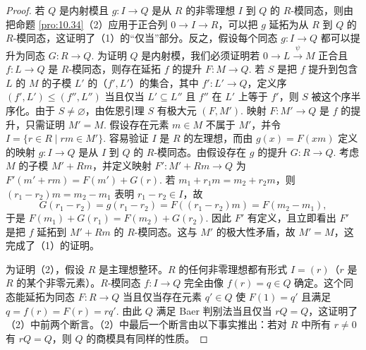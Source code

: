 \begin{proof}
若 \(Q\) 是内射模且 \(g : I \to Q\) 是从 \(R\) 的非零理想 \(I\) 到 \(Q\) 的 \(R\)-模同态，则由把命题 \ref{pro:10.34}（2）应用于正合列 \(0 \to I \to R\)，可以把 \(g\) 延拓为从 \(R\) 到 \(Q\) 的 \(R\)-模同态，这证明了（1）的“仅当”部分。反之，假设每个同态 \(g : I \to Q\) 都可以提升为同态 \(G : R \to Q\). 为证明 \(Q\) 是内射模，我们必须证明若 \(0 \to L \xrightarrow{\psi} M\) 正合且 \(f : L \to Q\) 是 \(R\)-模同态，则存在延拓 \(f\) 的提升 \(F : M \to Q\). 若 \(S\) 是把 \(f\) 提升到包含 \(L\) 的 \(M\) 的子模 \(L'\) 的（\(f', L'\)）的集合，其中 \(f' : L' \to Q\)，定义序 \((f', L') \leq (f'', L'')\) 当且仅当 \(L' \subseteq L''\) 且 \(f''\) 在 \(L'\) 上等于 \(f'\)，则 \(S\) 被这个序半序化。由于 \(S \neq \varnothing\)，由佐恩引理 \(S\) 有极大元 \((F, M')\). 映射 \(F : M' \to Q\) 是 \(f\) 的提升，只需证明 \(M' = M\). 假设存在元素 \(m \in M\) 不属于 \(M'\)，并令 \(I = \{r \in R \mid rm \in M'\}\). 容易验证 \(I\) 是 \(R\) 的左理想，而由 \(g(x) = F(xm)\) 定义的映射 \(g : I \to Q\) 是从 \(I\) 到 \(Q\) 的 \(R\)-模同态。由假设存在 \(g\) 的提升 \(G : R \to Q\). 考虑 \(M\) 的子模 \(M'+Rm\)，并定义映射 \(F' : M'+Rm \to Q\) 为 \(F'(m'+rm) = F(m')+G(r)\). 若 \(m_1+r_1m = m_2+r_2m\)，则 \((r_1-r_2)m = m_2-m_1\) 表明 \(r_1-r_2 \in I\)，故
\[
G(r_1-r_2) = g(r_1-r_2) = F((r_1-r_2)m) = F(m_2-m_1),
\]
于是 \(F(m_1)+G(r_1) = F(m_2)+G(r_2)\). 因此 \(F'\) 有定义，且立即看出 \(F'\) 是把 \(f\) 延拓到 \(M'+Rm\) 的 \(R\)-模同态。这与 \(M'\) 的极大性矛盾，故 \(M' = M\)，这完成了（1）的证明。

为证明（2），假设 \(R\) 是主理想整环。\(R\) 的任何非零理想都有形式 \(I = (r)\)（\(r\) 是 \(R\) 的某个非零元素）。\(R\)-模同态 \(f : I \to Q\) 完全由像 \(f(r) = q \in Q\) 确定。这个同态能延拓为同态 \(F : R \to Q\) 当且仅当存在元素 \(q' \in Q\) 使 \(F(1) = q'\) 且满足 \(q = f(r) = F(r) = rq'\). 由此 \(Q\) 满足 Baer 判别法当且仅当 \(rQ = Q\)，这证明了（2）中前两个断言。（2）中最后一个断言由以下事实推出：若对 \(R\) 中所有 \(r \neq 0\) 有 \(rQ = Q\)，则 \(Q\) 的商模具有同样的性质。
\end{proof}

